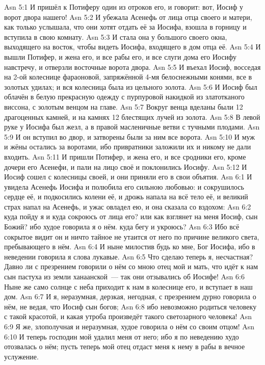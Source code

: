 \vs Asn 5:1
И пришёл к Потиферу один из
отроков его, и говорит: вот, Иосиф у ворот двора нашего!
\vs Asn 5:2
И убежала Асенефь от лица
отца своего и матери, как только услышала, что они хотят отдать её за Иосифа,
взошла в горницу и вступила в свою комнату.
\vs Asn 5:3
И стала она у большого своего окна,
выходящего на восток, чтобы видеть Иосифа, входящего в дом отца её.
\vs Asn 5:4
И вышли Потифер, и жена его,
и все рабы его, и все слуги дома его Иосифу навстречу, и отверзли восточные
ворота двора.
\vs Asn 5:5
И въехал Иосиф, восседая на 2-ой колеснице фараоновой,
запряжённой 4-мя белоснежными конями,
все в золотых удилах; и вся колесница была из цельного золота.
\vs Asn 5:6
И Иосиф был облачён в белую прекрасную одежду
с пурпуровой накидкой из златотканого виссона,
с золотым венцом на главе.
\vs Asn 5:7
Вокруг венца вделаны были 12 драгоценных камней,
и на камнях 12 блестящих лучей из золота.
\vs Asn 5:8
В левой руке у Иосифа был жезл,
а в правой масленичные ветви с тучными плодами.
\vs Asn 5:9
И он вступил во двор,
и затворены были за ним все ворота.
\vs Asn 5:10
И муж и жёны остались за
воротами, ибо привратники заложили их и никому не дали входить.
\vs Asn 5:11
И пришли Потифер, и жена его,
и все сродники его, кроме дочери его Асенефи,
и пали на лицо своё и поклонились Иосифу.
\vs Asn 5:12
И Иосиф сошел с колесницы
своей, и они приняли его в свои объятия.
\vs Asn 6:1
И увидела Асенефь Иосифа и полюбила его сильною любовью:
и сокрушилось сердце её, и подкосились колени её,
и дрожь напала на всё тело её,
и великий страх напал на Асенефь,
и ужас овладел ею, и она сказала со вздохом:
\vs Asn 6:2
куда пойду я и куда сокроюсь от лица его?
или как взглянет на меня Иосиф, сын Божий?
ибо худое говорила я о нём.
куда бегу и укроюсь?
\vs Asn 6:3
Ибо всё сокрытое видит он
и ничто тайное не утаится от него
по причине великого света, пребывающего в нём.
\vs Asn 6:4
И ныне милостив будь ко мне, Бог Иосифа,
ибо в неведении говорила я слова лукавые.
\vs Asn 6:5
Что сделаю теперь я, несчастная?
Давно ли с презрением говорили о нём со мною отец мой и мать,
что идёт к нам сын пастуха из земли ханаанской~--- так
они отзывались об Иосифе!
\vs Asn 6:6
Ныне же само солнце с неба приходит
к нам в колеснице его, и вступает в наш дом.
\vs Asn 6:7
И я, неразумная, дерзкая,
негодная, с презрением дурно говорила о нём,
не ведая, что Иосиф сын богов;
\vs Asn 6:8
ибо невозможно родиться человеку с такой красотой,
и какая утроба произведёт такого светозарного человека!
\vs Asn 6:9
Я же, злополучная и неразумная,
худое говорила о нём со своим отцом!
\vs Asn 6:10
И теперь господин мой удалил меня от него;
ибо я по неведению худо отозвалась о нём;
пусть теперь мой отец отдаст меня
к нему в рабы в вечное услужение.

